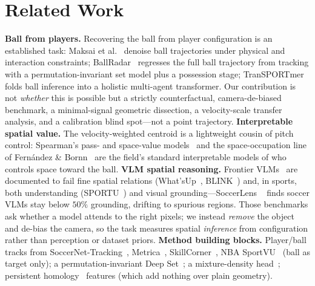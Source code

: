\section{Related Work}
\textbf{Ball from players.} Recovering the ball from player configuration is an established
task: Maksai et al.~\cite{maksai2016players} denoise ball trajectories under physical and
interaction constraints; BallRadar~\cite{kim2023ballradar} regresses the full ball trajectory
from tracking with a permutation-invariant set model plus a possession stage;
TranSPORTmer~\cite{capellera2024transportmer} folds ball inference into a holistic multi-agent
transformer. Our contribution is not \emph{whether} this is possible but a strictly
counterfactual, camera-de-biased benchmark, a minimal-signal geometric dissection, a
velocity-scale transfer analysis, and a calibration blind spot---not a point trajectory.
\textbf{Interpretable spatial value.} The velocity-weighted centroid is a lightweight cousin
of pitch control: Spearman's pass- and space-value models~\cite{spearman2017physics,spearman2018beyond}
and the space-occupation line of Fern\'andez \& Bornn~\cite{fernandez2018wide} are the field's
standard interpretable models of who controls space toward the ball.
\textbf{VLM spatial reasoning.} Frontier VLMs~\cite{achiam2023gpt4} are documented to fail
fine spatial relations (What'sUp~\cite{kamath2023whatsup}, BLINK~\cite{fu2024blink}) and, in
sports, both understanding (SPORTU~\cite{xia2025sportu}) and visual grounding---SoccerLens
~\cite{elsharkawi2026soccerlens} finds soccer VLMs stay below $50\%$ grounding, drifting to
spurious regions. Those benchmarks ask whether a model attends to the right pixels; we
instead \emph{remove} the object and de-bias the camera, so the task measures spatial
\emph{inference} from configuration rather than perception or dataset priors. \textbf{Method building blocks.} Player/ball tracks from
SoccerNet-Tracking~\cite{cioppa2022soccernet}, Metrica~\cite{metrica2020},
SkillCorner~\cite{skillcorner2020}, NBA SportVU~\cite{sportvu2016} (ball as target only); a
permutation-invariant Deep Set~\cite{zaheer2017deepsets}; a mixture-density
head~\cite{bishop1994mdn}; persistent homology~\cite{ripser2018} features (which add nothing
over plain geometry).

